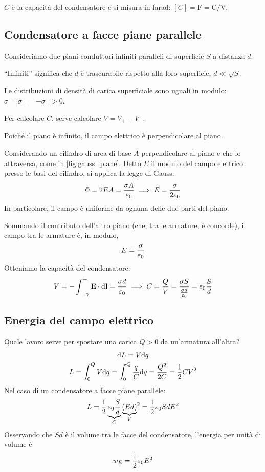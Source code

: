 $C$ è la capacità del condensatore e si misura in farad: $[C] = \unit{\farad} = \unit{\coulomb\per\volt}$.

\subsection{Condensatore a facce piane parallele}

Consideriamo due piani conduttori infiniti paralleli di superficie $S$ a distanza $d$.

``Infiniti'' significa che $d$ è trascurabile rispetto alla loro superficie, $d \ll \sqrt{S}$.

Le distribuzioni di densità di carica superficiale sono uguali in modulo: $\sigma = \sigma_+ = -\sigma_- > 0$.

Per calcolare $C$, serve calcolare $V = V_+ - V_-$.

Poiché il piano è infinito, il campo elettrico è perpendicolare al piano.


Considerando un cilindro di area di base $A$ perpendicolare al piano e che lo attraversa, come in \cref{fig:gauss_plane}.
Detto $E$ il modulo del campo elettrico presso le basi del cilindro, si applica la legge di Gauss:
\begin{equation}
    \Phi = 2 E A = \frac{\sigma A}{\varepsilon_0} \implies E = \frac{\sigma}{2 \varepsilon_0}
\end{equation}
In particolare, il campo è uniforme da ognuna delle due parti del piano.

Sommando il contributo dell'altro piano (che, tra le armature, è concorde), il campo tra le armature è, in modulo,
\begin{equation}
    E = \frac{\sigma}{\varepsilon_0}
\end{equation}
Otteniamo la capacità del condensatore:
\begin{equation}
    V = - \int_{-,\gamma}^+ \mathbf{E} \cdot \mathrm{d} \mathbf{l} = \frac{\sigma d}{\varepsilon_0} \implies
    C = \frac{Q}{V} = \frac{\sigma S}{\frac{\sigma d}{\varepsilon_0}} = \varepsilon_0 \frac{S}{d}
\end{equation}

\subsection{Energia del campo elettrico}

Quale lavoro serve per spostare una carica $Q > 0$ da un'armatura all'altra?
\begin{gather}
    \mathrm{d} L = V \mathrm{d} q \\
    L = \int_0^Q V \mathrm{d} q = \int_0^Q \frac{q}{C} \mathrm{d} q = \frac{Q^2}{2 C} = \frac{1}{2} C V^2
\end{gather}
Nel caso di un condensatore a facce piane parallele:
\begin{equation}
    L = \frac{1}{2} \underbrace{\varepsilon_0 \frac{S}{d}}_C {\underbrace{(E d)}_V}^2 = \frac{1}{2} \varepsilon_0 S d E^2
\end{equation}
Osservando che $S d$ è il volume tra le facce del condensatore, l'energia per unità di volume è
\begin{equation}
    w_E = \frac{1}{2} \varepsilon_0 E^2
\end{equation}

